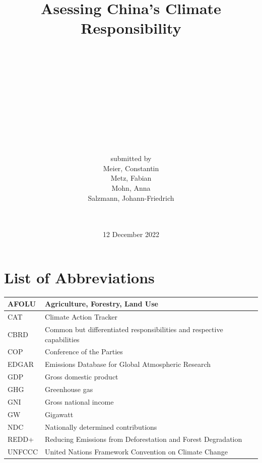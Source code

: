 \documentclass[
  12pt,
]{article}
\title{Asessing China's Climate Responsibility\\
\strut \\
\strut \\
\strut \\}
\subtitle{\textbf{Final Paper}\\
\strut \\
\strut \\
GRAD-E1402\\
Data Perspectives on GHG Emissions\\
Hertie School of Governance\\
\strut \\}
\author{submitted by\\
Meier, Constantin\\
Metz, Fabian\\
Mohn, Anna\\
Salzmann, Johann-Friedrich\\
\strut \\}
\date{12 December 2022}
\numberwithin{equation}{section}
\numberwithin{table}{section}
\numberwithin{figure}{section}
\begin{document}
\maketitle

\renewcommand{\harvardand}{\&}
\renewcommand{\harvardurl}{\textbf{URL:} \url}

\nocite{R-rmarkdown,R-tidyverse,R-eurostat,R-WDI,R-plotly,R-imputeTS,R-kableExtra}

\thispagestyle{empty}

\newpage
{}
\section*{List of Abbreviations}
\thispagestyle{empty}
\onehalfspacing

\begin{table}[!ht]
    \centering
    \begin{tabular}{|l|l|}
    \hline
        AFOLU &  Agriculture, Forestry, Land Use  \\ \hline
        CAT &  Climate Action Tracker  \\ \hline
        CBRD &  Common but differentiated responsibilities and respective capabilities  \\ \hline
        COP &  Conference of the Parties  \\ \hline
        EDGAR &  Emissions Database for Global Atmospheric Research  \\ \hline
        GDP &  Gross domestic product  \\ \hline
        GHG &  Greenhouse gas  \\ \hline
        GNI &  Gross national income  \\ \hline
        GW &  Gigawatt  \\ \hline
        NDC &  Nationally determined contributions  \\ \hline
        REDD+ &  Reducing Emissions from Deforestation and Forest Degradation  \\ \hline
        UNFCCC & United Nations Framework Convention on Climate Change \\ \hline
    \end{tabular}
\end{table}

\singlespacing
\newpage
{}
\tableofcontents
\thispagestyle{empty}
\onehalfspacing
\end{document}
